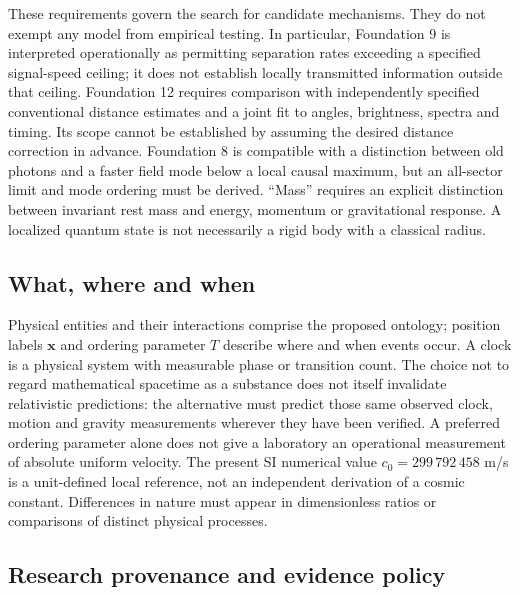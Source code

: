 \documentclass[
  11pt,
  twoside]{article}
\begin{document}
These requirements govern the search for candidate mechanisms. They do
not exempt any model from empirical testing. In particular, Foundation 9
is interpreted operationally as permitting separation rates exceeding a
specified signal-speed ceiling; it does not establish locally
transmitted information outside that ceiling. Foundation 12 requires
comparison with independently specified conventional distance estimates
and a joint fit to angles, brightness, spectra and timing. Its scope
cannot be established by assuming the desired distance correction in
advance. Foundation 8 is compatible with a distinction between old
photons and a faster field mode below a local causal maximum, but an
all-sector limit and mode ordering must be derived. ``Mass'' requires an
explicit distinction between invariant rest mass and energy, momentum or
gravitational response. A localized quantum state is not necessarily a
rigid body with a classical radius.

\subsection{What, where and when}\label{what-where-and-when}

Physical entities and their interactions comprise the proposed ontology;
position labels \(\mathbf{x}\) and ordering parameter \(T\) describe
where and when events occur. A clock is a physical system with
measurable phase or transition count. The choice not to regard
mathematical spacetime as a substance does not itself invalidate
relativistic predictions: the alternative must predict those same
observed clock, motion and gravity measurements wherever they have been
verified. A preferred ordering parameter alone does not give a
laboratory an operational measurement of absolute uniform velocity. The
present SI numerical value \(c_0=299\,792\,458\) m/s is a unit-defined
local reference, not an independent derivation of a cosmic constant.
Differences in nature must appear in dimensionless ratios or comparisons
of distinct physical processes.

\subsection{Research provenance and evidence
policy}\label{research-provenance-and-evidence-policy}
\end{document}
